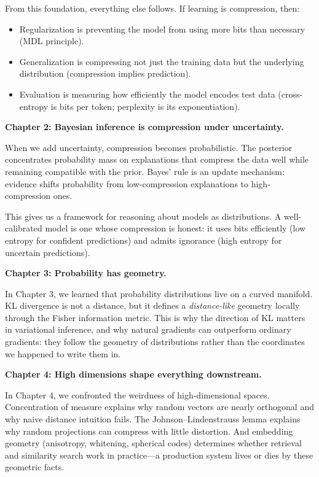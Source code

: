 From this foundation, everything else follows. If learning is compression, then:
\begin{itemize}
\item Regularization is preventing the model from using more bits than necessary (MDL principle).
\item Generalization is compressing not just the training data but the underlying distribution (compression implies prediction).
\item Evaluation is measuring how efficiently the model encodes test data (cross-entropy is bits per token; perplexity is its exponentiation).
\end{itemize}

\textbf{Chapter 2: Bayesian inference is compression under uncertainty.}

When we add uncertainty, compression becomes probabilistic. The posterior concentrates probability mass on explanations that compress the data well while remaining compatible with the prior. Bayes' rule is an update mechanism: evidence shifts probability from low-compression explanations to high-compression ones.

This gives us a framework for reasoning about models as distributions. A well-calibrated model is one whose compression is honest: it uses bits efficiently (low entropy for confident predictions) and admits ignorance (high entropy for uncertain predictions).

\textbf{Chapter 3: Probability has geometry.}

In Chapter 3, we learned that probability distributions live on a curved manifold. KL divergence is not a distance, but it defines a \emph{distance-like} geometry locally through the Fisher information metric. This is why the direction of KL matters in variational inference, and why natural gradients can outperform ordinary gradients: they follow the geometry of distributions rather than the coordinates we happened to write them in.

\textbf{Chapter 4: High dimensions shape everything downstream.}

In Chapter 4, we confronted the weirdness of high-dimensional spaces. Concentration of measure explains why random vectors are nearly orthogonal and why naive distance intuition fails. The Johnson--Lindenstrauss lemma explains why random projections can compress with little distortion. And embedding geometry (anisotropy, whitening, spherical codes) determines whether retrieval and similarity search work in practice---a production system lives or dies by these geometric facts.

